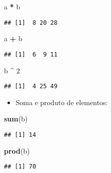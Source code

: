 \documentclass[]{article}
\newenvironment{Shaded}{\begin{snugshade}}{\end{snugshade}}
\newcommand{\KeywordTok}[1]{\textcolor[rgb]{0.13,0.29,0.53}{\textbf{#1}}}
\newcommand{\DecValTok}[1]{\textcolor[rgb]{0.00,0.00,0.81}{#1}}
\newcommand{\StringTok}[1]{\textcolor[rgb]{0.31,0.60,0.02}{#1}}
\newcommand{\OperatorTok}[1]{\textcolor[rgb]{0.81,0.36,0.00}{\textbf{#1}}}
\newcommand{\NormalTok}[1]{#1}
\providecommand{\tightlist}{%
  \setlength{\itemsep}{0pt}\setlength{\parskip}{0pt}}
\begin{document}
\begin{Shaded}
\begin{Highlighting}[]
\NormalTok{a }\OperatorTok{*}\StringTok{ }\NormalTok{b}
\end{Highlighting}
\end{Shaded}

\begin{verbatim}
## [1]  8 20 28
\end{verbatim}

\begin{Shaded}
\begin{Highlighting}[]
\NormalTok{a }\OperatorTok{+}\StringTok{ }\NormalTok{b}
\end{Highlighting}
\end{Shaded}

\begin{verbatim}
## [1]  6  9 11
\end{verbatim}

\begin{Shaded}
\begin{Highlighting}[]
\NormalTok{b }\OperatorTok{^}\StringTok{ }\DecValTok{2}
\end{Highlighting}
\end{Shaded}

\begin{verbatim}
## [1]  4 25 49
\end{verbatim}

\begin{itemize}
\tightlist
\item
  Soma e produto de elementos:
\end{itemize}

\begin{Shaded}
\begin{Highlighting}[]
\KeywordTok{sum}\NormalTok{(b)}
\end{Highlighting}
\end{Shaded}

\begin{verbatim}
## [1] 14
\end{verbatim}

\begin{Shaded}
\begin{Highlighting}[]
\KeywordTok{prod}\NormalTok{(b)}
\end{Highlighting}
\end{Shaded}

\begin{verbatim}
## [1] 70
\end{verbatim}
\end{document}
